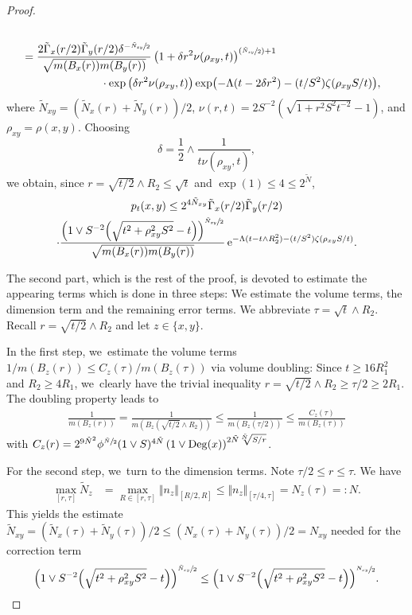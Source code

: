 \documentclass[JEP,XML,SOM,Unicode,published]{cedram}
\newcommand{\Psfrac}[2]{(\sfrac{#1}{#2})}
\theoremstyle{plain}
\theoremstyle{definition}
\newcommand{\euler}{\mathrm{e}}
\DeclareMathOperator{\Deg}{Deg}
\begin{document}
\begin{proof}
\begin{align*}
\\
&
=
\frac{2
\tilde\Gamma_{x} (r/2)\tilde\Gamma_{y}(r/2)\delta^{-\sfrac{\tilde N_{xy}}{2}}}
{\sqrt{m(B_{x}(r))m(B_{y}(r))}} \left(1+\delta r^2\nu(\rho_{xy},t)\right)^{\Psfrac{\tilde N_{xy}}{2}+1}
\\
&\hspace*{2.5cm}\cdot
\exp\left(\delta r^2\nu(\rho_{xy},t)\right)
\exp\bigl(-\Lambda (t-2\delta r^2)-(t/S^2)\zeta(\rho_{xy}S/t)\bigr),
\end{align*}
where $\tilde N_{xy}=(\tilde N_x(r)+\tilde N_y(r))/2$, $\nu(r,t)=2 S^{-2}\left(\sqrt{1+{r^2S^2}{t^{-2}}}-1\right) $, and $\rho_{xy}=\rho(x,y)$. Choosing
\[
\delta=\frac{1}{2}\wedge \frac{1}{t\nu(\rho_{xy},t)},
\]
we obtain, since $r=\sqrt{t/2}\wedge R_2\leq \sqrt t$ and $ \exp(1)\leq 4 \leq 2^{\tilde N} $,
\begin{multline*}
p_{t}(x,y)
\leq 2^{4{\tilde N_{xy}}}
\tilde \Gamma_x(r/2)\tilde \Gamma_y(r/2)
\\
\cdot \frac{
\left(1\vee {S^{-2}}{\left(\sqrt{t^2+\rho_{xy}^2S^2}-t\right)}\right)^{\sfrac{\tilde N_{xy}}{2}}}
{\sqrt{m(B_{x}(r))m(B_{y}(r))}}\,
\euler^{-\Lambda (t-t\wedge R_2^2)-(t/S^2)\zeta(\rho_{xy}S/t)}.
\end{multline*}

The second part, which is the rest of the proof, is devoted to estimate the appearing terms which is done in three steps: We estimate the volume terms, the dimension term and the remaining error terms.
We abbreviate $\tau=\sqrt t\wedge R_2$. Recall $ r=\sqrt{t/2}\wedge R_2 $ and let $ z\in \{x,y\} $.

In the first step, we~estimate the volume terms $1/ m(B_{z}(r))\leq C_{z}(\tau)/m(B_{z}(\tau)) $ via volume doubling:
Since $ t\geq 16R_1^2$ and $ R_{2}\ge 4R_{1} $, we~clearly have the trivial inequality $r= \sqrt{t/2} \wedge R_2\geq \tau/2\geq 2R_1$. The doubling property leads to
\begin{align*}
\frac{1}{m(B_{z}(r))}
=
\frac{1}{m(B_{z}(\sqrt {t/2}\wedge R_2))}
\leq
\frac{1}{m(B_{z}(\tau/2))}
\leq
\frac{C_z(\tau)}{m(B_{z}(\tau))}
\end{align*}
with
{$ C_z(r)=2^{9 \tilde N^2}\phi^{\sfrac{\tilde N}{2}}(1\vee S)^{4\tilde N}\left(1\vee\Deg(x)\right)^{2\tilde N\sqrt[\tilde N]{S/r}} $.}

For the second step, we~turn to the dimension terms. Note $\tau/2\leq r\leq \tau$. We have
\begin{align*}
\max_{[r,\tau]}\tilde N_{z}&= \max_{R\in [r,\tau]}\Vert n_z\Vert_{[R/2,R] }\leq \Vert n_z\Vert_{[\tau/4,\tau] }= N_{z}(\tau)=:N.
\end{align*}
This yields the estimate $ \tilde N_{xy}=(\tilde N_{x}(\tau)+\tilde N_{y}(\tau))/2 \leq( N_{x}(\tau)+ N_{y}(\tau))/2=N_{xy} $ needed for the correction term
\begin{align*}
\left(1\vee {S^{-2}}{\left(\sqrt{t^2+\rho_{xy}^2S^2}-t\right)}\right)^{\sfrac{\tilde N_{xy}}{2}}\leq \Bigl(1\vee {S^{-2}}{\left(\sqrt{t^2+\rho_{xy}^2S^2}-t\right)}\Bigr)^{\sfrac{N_{xy}}{2}}.
\end{align*}


\end{proof}
\end{document}
